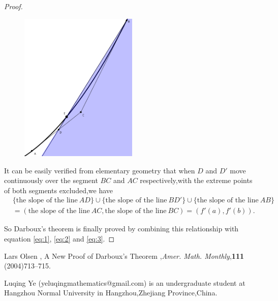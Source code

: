 \documentclass{article} \usepackage{maa-monthly}
\theoremstyle{theorem} \newtheorem*{theorem}{Theorem}
\theoremstyle{definition} \newtheorem*{definition}{Definition}
\begin{document}
\begin{proof}
\begin{figure}[h]\centering
\includegraphics[width=0.5\textwidth]{A_geometric_proof_of_Darboux_theorem2.png}
  \caption{}
  \label{fig:2}
\end{figure}

It can be easily verified from elementary geometry that when $D$ and $D'$ move continuously over the segment $BC$ and $AC$
respectively,with the extreme points of both segments excluded,we have
\begin{align*}
&\{\mbox{the slope of the line}~AD\}\cup\{\mbox{the slope of the
  line}~BD'\}\cup\{\mbox{the slope of the line}~AB\}\\&=(\mbox{the slope of the line}~AC,\mbox{the slope of the line}~BC)=(f'(a),f'(b)).
\end{align*}

So Darboux's theorem is finally proved by combining this relationship with  equation \eqref{eq:1},
\eqref{eq:2} and \eqref{eq:3}.
\end{proof}
\begin{thebibliography}{1}
 Lars Olsen , A New Proof of Darboux's Theorem ,\textit{Amer. Math. Monthly},\textbf{111} (2004)713--715.
\end{thebibliography}

\begin{biog}
\item[Luqing Ye] (yeluqingmathematics@gmail.com) is an undergraduate
  student at Hangzhou Normal University in Hangzhou,Zhejiang Province,China.
\end{biog}
\end{document}
